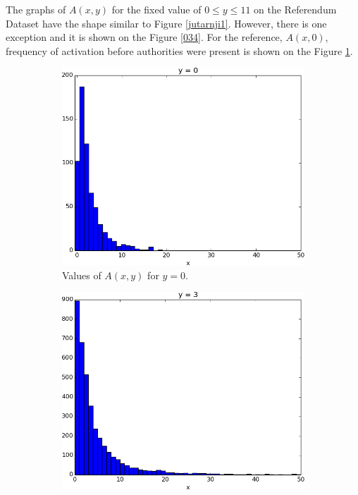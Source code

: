 \documentclass[times, utf8, zavrsni]{fer}
\begin{document}
 The graphs of $A(x,y)$ for the fixed value of $ 0 \le y \leq 11$ on the Referendum Dataset have the shape similar to Figure \ref{jutarnji1}. However, there is one exception and it is shown on the Figure \ref{034}. For the reference,  $A(x, 0)$, frequency of activation  before authorities were present is shown on the Figure \ref{y0}. 
\begin{figure}
\begin{subfigure}{\textwidth}
\centering
\includegraphics[scale=0.4]{y0.png}
\caption{Values of $A(x, y)$ for $y=0$.}
\label{y0}
\end{subfigure}%
\par\bigskip
\begin{subfigure}{\textwidth}
\centering
\includegraphics[scale=0.4]{jutarnji1.png}

\end{subfigure}
\end{figure}
\end{document}
